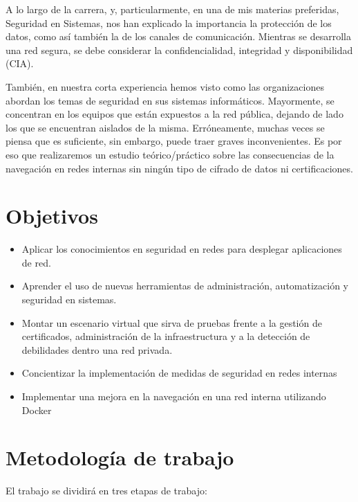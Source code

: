 %


A lo largo de la carrera, y, particularmente, en una de mis materias preferidas, 
Seguridad en Sistemas, nos han explicado la importancia la protección de los 
datos, como así también la de los canales de comunicación. Mientras se desarrolla 
una red segura, se debe considerar la confidencialidad, integridad y disponibilidad 
(CIA). 

También, en nuestra corta experiencia hemos visto como las organizaciones 
abordan los temas de seguridad en sus sistemas informáticos. Mayormente, se 
concentran en los equipos que están expuestos a la red pública, dejando de 
lado los que se encuentran aislados de la misma. Erróneamente, muchas veces 
se piensa que es suficiente, sin embargo, puede traer graves inconvenientes. 
Es por eso que realizaremos un estudio teórico/práctico sobre las consecuencias 
de la navegación en redes internas sin ningún tipo de cifrado de datos ni 
certificaciones.

\section{Objetivos}

\begin{itemize}
    \setlength\itemsep{-0.6em}
    \item Aplicar los conocimientos en seguridad en redes para desplegar aplicaciones de red.
    \item Aprender el uso de nuevas herramientas de administración, automatización y seguridad en sistemas.
    \item Montar un escenario virtual que sirva de pruebas frente a la gestión de certificados, administración de la infraestructura y a la detección de debilidades dentro una red privada.
    \item Concientizar la implementación de medidas de seguridad en redes internas
    \item Implementar una mejora en la navegación en una red interna utilizando Docker
\end{itemize}


\section{Metodología de trabajo}
El trabajo se dividirá en tres etapas de trabajo:

